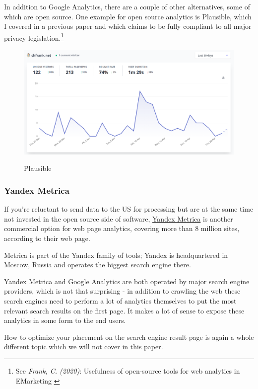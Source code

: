 In addition to Google Analytics, there are a couple of other alternatives, some of which are open source. One example for open source analytics is Plausible, which I covered in a previous paper and which claims to be fully compliant to all major privacy legislation.\footnote{See \textit{Frank, C. (2020)}: Usefulness of open-source tools for web analytics in EMarketing \cite{previousPaper}} 

\begin{figure}[H]
\centering
\caption {Plausible}
\includegraphics[width=\linewidth]{images/plausible.png}
\label{fig:plausible}
\end{figure}

\subsubsection{Yandex Metrica}

If you're reluctant to send data to the US for processing but are at the same time not invested in the open source side of software, \href{https://metrica.yandex.com/}{Yandex Metrica} is another commercial option for web page analytics, covering more than 8 million sites, according to their web page.

Metrica is part of the Yandex family of tools; Yandex is headquartered in Moscow, Russia and operates the biggest search engine there.

Yandex Metrica and Google Analytics are both operated by major search engine providers, which is not that surprising - in addition to crawling the web these search engines need to perform a lot of analytics themselves to put the most relevant search results on the first page. It makes a lot of sense to expose these analytics in some form to the end users.

How to optimize your placement on the search engine result page is again a whole different topic which we will not cover in this paper.

